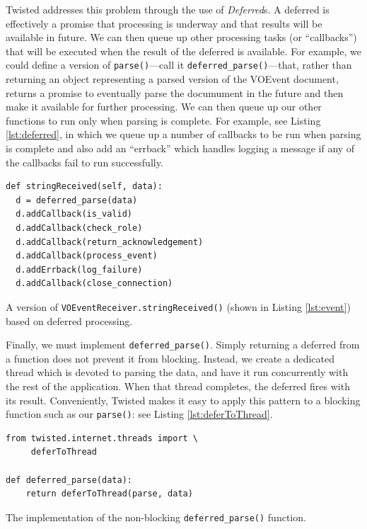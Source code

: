 \documentclass[5p,authoryear]{elsarticle}
\begin{document}
Twisted addresses this problem through the use of \textit{Deferred}s. A
deferred is effectively a promise that processing is underway and that results
will be available in future. We can then queue up other processing tasks (or
``callbacks'') that will be executed when the result of the deferred is
available. For example, we could define a version of
\texttt{parse()}---call it
\texttt{deferred\_parse()}---that, rather than returning an object
representing a parsed version of the VOEvent document, returns a promise to
eventually parse the documument in the future and then make it available for
further processing. We can then queue up our other functions to run only when
parsing is complete. For example, see Listing \ref{lst:deferred}, in which we
queue up a number of callbacks to be run when parsing is complete and also add
an ``errback'' which handles logging a message if any of the callbacks fail to
run successfully.

\begin{listing}[H]
\begin{verbatim}
def stringReceived(self, data):
  d = deferred_parse(data)
  d.addCallback(is_valid)
  d.addCallback(check_role)
  d.addCallback(return_acknowledgement)
  d.addCallback(process_event)
  d.addErrback(log_failure)
  d.addCallback(close_connection)
\end{verbatim}
\caption{A version of \texttt{VOEventReceiver.stringReceived()} (shown in
Listing \ref{lst:event}) based on deferred processing.}
\label{lst:deferred}
\end{listing}

Finally, we must implement \texttt{deferred\_parse()}.  Simply returning a
deferred from a function does not prevent it from blocking.  Instead, we
create a dedicated thread which is devoted to parsing the data, and have it
run concurrently with the rest of the application. When that thread completes,
the deferred fires with its result. Conveniently, Twisted makes it easy to
apply this pattern to a blocking function such as our \texttt{parse()}: see
Listing \ref{lst:deferToThread}.

\begin{listing}[H]
\begin{verbatim}
from twisted.internet.threads import \
     deferToThread

def deferred_parse(data):
    return deferToThread(parse, data)
\end{verbatim}
\caption{The implementation of the non-blocking \texttt{deferred\_parse()} function.}
\label{lst:deferToThread}
\end{listing}
\end{document}
